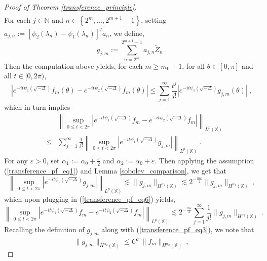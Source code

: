 \documentclass[10pt,a4paper]{amsart}
\newcommand{\N}{\mathbb N}%
\newcommand{\X}{\mathbb X}%
\begin{document}
\begin{proof}[Proof of Theorem \ref{transference_principle}]
\begin{eqnarray*}
\end{eqnarray*}
For each $j \in \N$ and $n \in \left\{2^m, \dots, 2^{m+1}-1\right\}$, setting $a_{j,n}:= \left[\psi_2(\lambda_n)-\psi_1(\lambda_n)\right]^j a_n$, we define,
\begin{equation*}
g_{j,m}:= \sum_{n=2^m}^{2^{m+1}-1} a_{j,n} \tilde{Z}_n\;.
\end{equation*}
Then the computation above yields, for each $m \ge m_0+1$, for all $\theta \in [0,\pi]$ and all $t \in [0,2\pi)$,
\begin{equation*}
\left|e^{-it\psi_1\left(\sqrt{-\Delta}\right)} f_m(\theta)   - e^{-it\psi_2\left(\sqrt{-\Delta}\right)} f_m(\theta) \right| \le  \sum_{j=1}^\infty \frac{t^j}{j!} \left|e^{-it\psi_1\left(\sqrt{-\Delta}\right)} g_{j,m}(\theta)\right|\:,
\end{equation*}
which in turn implies
\begin{eqnarray} \label{transference_pf_eq6}
&&\left\|\sup_{0\le t<2\pi}\left|e^{-it\psi_1\left(\sqrt{-\Delta}\right)} f_m   - e^{-it\psi_2\left(\sqrt{-\Delta}\right)} f_m \right|\right\|_{L^p(\X)} \nonumber\\
&\le & \sum_{j=1}^\infty \frac{1}{j!} \left\| \sup_{0\le t<2\pi} \left|e^{-it\psi_1\left(\sqrt{-\Delta}\right)} g_{j,m}\right|\right\|_{L^p(\X)}\:.
\end{eqnarray}
For any $\varepsilon>0$, set $\alpha_1:=\alpha_0+\frac{\varepsilon}{2}$ and $\alpha_2:=\alpha_0+\varepsilon$. Then applying the assumption (\ref{transference_pf_eq1}) and Lemma \ref{sobolev_comparison}, we get that
\begin{equation*}
\left\| \sup_{0\le t<2\pi} \left|e^{-it\psi_1\left(\sqrt{-\Delta}\right)} g_{j,m}\right|\right\|_{L^p(\X)} \lesssim \|g_{j,m}\|_{H^{\alpha_1}(\X)} \lesssim 2^{-\frac{m\varepsilon}{2}}  \|g_{j,m}\|_{H^{\alpha_2}(\X)}\:,
\end{equation*}
which upon plugging in (\ref{transference_pf_eq6}) yields,
\begin{equation} \label{transference_pf_eq7}
\left\|\sup_{0\le t<2\pi}\left|e^{-it\psi_1\left(\sqrt{-\Delta}\right)} f_m   - e^{-it\psi_2\left(\sqrt{-\Delta}\right)} f_m \right|\right\|_{L^p(\X)} \lesssim 2^{-\frac{m\varepsilon}{2}} \sum_{j=1}^\infty \frac{1}{j!} \|g_{j,m}\|_{H^{\alpha_2}(\X)}\:.
\end{equation}
Recalling the definition of $g_{j,m}$ along with (\ref{transference_pf_eq3}), we note that
\begin{equation*}
\|g_{j,m}\|_{H^{\alpha_2}(\X)} \le C^j\:\|f_m\|_{H^{\alpha_2}(\X)}\:,
\end{equation*}

\end{proof}
\end{document}
